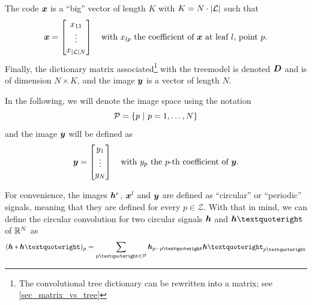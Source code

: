 The code $\x$ is a “big” vector of length $K$ with $K = N \cdot |\L|$ such that \begin{equation*}\x = \begin{bmatrix}x_{11} \\ \vdots \\ x_{|\L|N}\end{bmatrix} \quad \text{with $x_{lp}$ the coefficient of $\x$ at leaf $l$, point $p$.}\end{equation*} 
Finally, the dictionary matrix associated\footnote{The convolutional tree dictionary can be rewritten into a matrix; see \cref{sec_matrix_vs_tree}} with the \gls{treemodel} is denoted $\D$ and is of dimension $N \times K$, and the image $\y$ is a vector of length $N$.

\noindent
In the following, we will denote the image space using the notation
\begin{equation*}\P = \{p ~|~ p=1,\dots,N\}\end{equation*}
and the image $\y$ will be defined as
\begin{equation*}\y = \begin{bmatrix}y_1 \\ \vdots \\ y_N\end{bmatrix} \quad \text{with $y_p$ the $p$-th coefficient of $\y$.}
\end{equation*}

\noindent
For convenience, the images $\h^e$, $\x^l$ and $\y$ are defined as “circular” or “periodic” signals, meaning that they are defined for every $p \in \mathcal{Z}$. With that in mind, we can define the circular convolution for two circular signals $\h$ and $\h’$ of $\R^N$ as
\begin{equation*}(\h * \h’)_p = \sum_{p’ \in \P} \h_{p-p’} \h’_{p’}\end{equation*}

